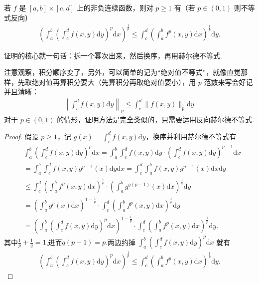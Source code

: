 \documentclass[../../main.tex]{subfiles}
\begin{document}
\begin{theorem}[Minkowski不等式]\label{theorem:Minkowski(闵可夫斯基)不等式}
若 $f$ 是 $[a,b] \times [c,d]$ 上的非负连续函数，则对 $p \geqslant 1$ 有（若 $p \in (0,1)$ 则不等式反向）
\begin{align*}
\left( \int_a^b \left( \int_c^d f(x,y) \mathrm{d}y \right)^p \mathrm{d}x \right)^{\frac{1}{p}} \leqslant \int_c^d \left( \int_a^b f^p(x,y) \mathrm{d}x \right)^{\frac{1}{p}} \mathrm{d}y.
\end{align*}
\end{theorem}
\begin{note}
证明的核心就一句话：拆一个幂次出来，然后换序，再用赫尔德不等式.
\end{note}
\begin{remark}
注意观察，积分顺序变了，另外，可以简单的记为“绝对值不等式”，就像直觉那样，先取绝对值再算积分要大（先算积分再取绝对值要小），用 $p$ 范数来写会好记并且清晰：
\begin{align*}
\left\| \int_c^d f(x,y) \mathrm{d}y \right\|_p \leqslant  \int_c^d \|f(x,y)\|_p \mathrm{d}y.
\end{align*}
对于 $p \in (0,1)$ 的情形，证明方法是完全类似的，只需要运用反向赫尔德不等式.
\end{remark}
\begin{proof}
假设 $p \geqslant  1$，记 $g(x) = \int_c^d f(x,y) \mathrm{d}y$，换序并利用\hyperref[theorem:Hold(赫尔德)不等式(积分形式)]{赫尔德不等式}有
\begin{align*}
&\int_a^b \left( \int_c^d f(x,y) \mathrm{d}y \right)^p \mathrm{d}x = \int_a^b \int_c^d f(x,y) \mathrm{d}y \cdot \left( \int_c^d f(x,y) \mathrm{d}y \right)^{p-1} \mathrm{d}x
\\
&= \int_a^b \int_c^d f(x,y) g^{p-1}(x) \mathrm{d}y \mathrm{d}x = \int_c^d \int_a^b f(x,y) g^{p-1}(x) \mathrm{d}x \mathrm{d}y
\\
&\leqslant \int_c^d \left( \int_a^b f^p(x,y) \mathrm{d}x \right)^{\frac{1}{p}} \cdot \left( \int_a^b g^{q(p-1)}(x) \mathrm{d}x \right)^{\frac{1}{q}} \mathrm{d}y
\\
&= \left( \int_a^b g^p(x) \mathrm{d}x \right)^{1-\frac{1}{p}} \cdot \int_c^d \left( \int_a^b f^p(x,y) \mathrm{d}x \right)^{\frac{1}{p}} \mathrm{d}y
\\
&= \left( \int_a^b \left( \int_c^d f(x,y) \mathrm{d}y \right)^p \mathrm{d}x \right)^{1-\frac{1}{p}} \cdot \int_c^d \left( \int_a^b f^p(x,y) \mathrm{d}x \right)^{\frac{1}{p}} \mathrm{d}y.
\end{align*}
其中$\frac{1}{p}+\frac{1}{q}=1$,进而$q(p-1)=p$.两边约掉 $\int_a^b \left( \int_c^d f(x,y) \mathrm{d}y \right)^p \mathrm{d}x$ 就有
\begin{align*}
\left( \int_a^b \left( \int_c^d f(x,y) \mathrm{d}y \right)^p \mathrm{d}x \right)^{\frac{1}{p}} \leqslant \int_c^d \left( \int_a^b f^p(x,y) \mathrm{d}x \right)^{\frac{1}{p}} \mathrm{d}y.
\end{align*}
\end{proof}
\end{document}
